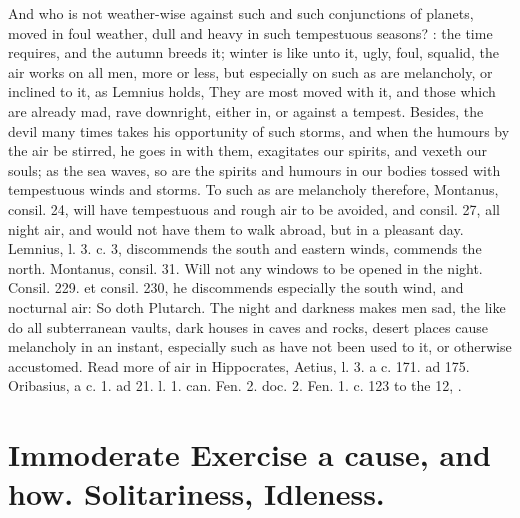 {{And who is not weather-wise against such and such conjunctions of
planets, moved in foul weather, dull and heavy in such tempestuous
seasons?  : the time requires,
and the autumn breeds it; winter is like unto it, ugly, foul, squalid,
the air works on all men, more or less, but especially on such as are
melancholy, or inclined to it, as Lemnius holds, They are most
moved with it, and those which are already mad, rave downright, either
in, or against a tempest. Besides, the devil many times takes his
opportunity of such storms, and when the humours by the air be stirred,
he goes in with them, exagitates our spirits, and vexeth our souls; as
the sea waves, so are the spirits and humours in our bodies tossed with
tempestuous winds and storms. To such as are melancholy therefore,
Montanus, consil. 24, will have tempestuous and rough air to be
avoided, and consil. 27, all night air, and would not have them to walk
abroad, but in a pleasant day. Lemnius, l. 3. c. 3, discommends the
south and eastern winds, commends the north. Montanus, consil. 31.
Will not any windows to be opened in the night. Consil. 229. et
consil. 230, he discommends especially the south wind, and nocturnal
air: So doth Plutarch. The night and darkness makes men sad, the
like do all subterranean vaults, dark houses in caves and rocks, desert
places cause melancholy in an instant, especially such as have not been
used to it, or otherwise accustomed. Read more of air in Hippocrates,
Aetius, l. 3. a c. 171. ad 175. Oribasius, a c. 1. ad 21. \Avicenna{} l. 1.
can. Fen. 2. doc. 2. Fen. 1. c. 123 to the 12, \etc{}.

\section[Immoderate Exercise, Idleness]{Immoderate Exercise a cause, and how. Solitariness, Idleness.}

}}
